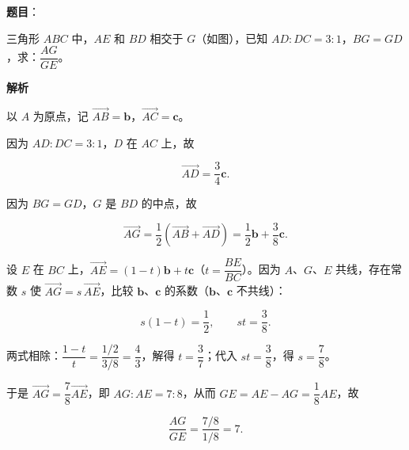 \begin{answer}

\textbf{题目}：

三角形 $ABC$ 中，$AE$ 和 $BD$ 相交于 $G$（如图），已知 $AD:DC=3:1$，$BG=GD$，求：$\dfrac{AG}{GE}$。
\nopagebreak[4]
\begin{center}\end{center}
\nopagebreak[4]
\textbf{解析}
\nopagebreak[4]
\begin{center}\end{center}
\nopagebreak[4]
以 $A$ 为原点，记 $\vec{AB}=\boldsymbol b$，$\vec{AC}=\boldsymbol c$。

因为 $AD:DC=3:1$，$D$ 在 $AC$ 上，故

\nopagebreak[4]
\[
\vec{AD}=\frac34\boldsymbol c.
\]

因为 $BG=GD$，$G$ 是 $BD$ 的中点，故

\nopagebreak[4]
\[
\vec{AG}=\frac12\left(\vec{AB}+\vec{AD}\right)=\frac12\boldsymbol b+\frac38\boldsymbol c.
\]

设 $E$ 在 $BC$ 上，$\vec{AE}=(1-t)\boldsymbol b+t\boldsymbol c$（$t=\dfrac{BE}{BC}$）。因为 $A$、$G$、$E$ 共线，存在常数 $s$ 使 $\vec{AG}=s\,\vec{AE}$，比较 $\boldsymbol b$、$\boldsymbol c$ 的系数（$\boldsymbol b$、$\boldsymbol c$ 不共线）：

\nopagebreak[4]
\[
s(1-t)=\frac12,\qquad st=\frac38.
\]

两式相除：$\dfrac{1-t}{t}=\dfrac{1/2}{3/8}=\dfrac43$，解得 $t=\dfrac37$；代入 $st=\dfrac38$，得 $s=\dfrac78$。

于是 $\vec{AG}=\dfrac78\vec{AE}$，即 $AG:AE=7:8$，从而 $GE=AE-AG=\dfrac18AE$，故

\nopagebreak[4]
\[
\frac{AG}{GE}=\frac{7/8}{1/8}=7.
\]


\end{answer}